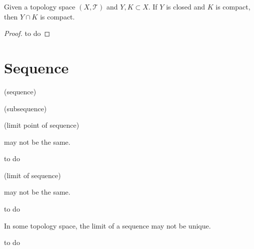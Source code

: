 \begin{theorem}
Given a topology space $(X, \mathcal{T})$ and $Y, K \subset X$. If $Y$ is closed and $K$ is compact, then $Y \cap K$ is compact. 
\end{theorem}

\begin{theorem}
\end{theorem}

\begin{proof}
to do
\end{proof}

\section{Sequence}

\begin{definition}
(sequence)
\end{definition}

\begin{definition}
(subsequence)
\end{definition}

\begin{definition}
\label{definition:limit point of sequence}
(limit point of sequence)
\end{definition}

\begin{warning}
may not be the same. 
\end{warning}

\begin{example}
to do
\end{example}

\begin{definition}
\label{definition:limit of sequence}
(limit of sequence)
\end{definition}

\begin{warning}
may not be the same. 
\end{warning}

\begin{example}
to do
\end{example}

\begin{warning}
In some topology space, the limit of a sequence may not be unique. 
\end{warning}

\begin{example}
to do
\end{example}

